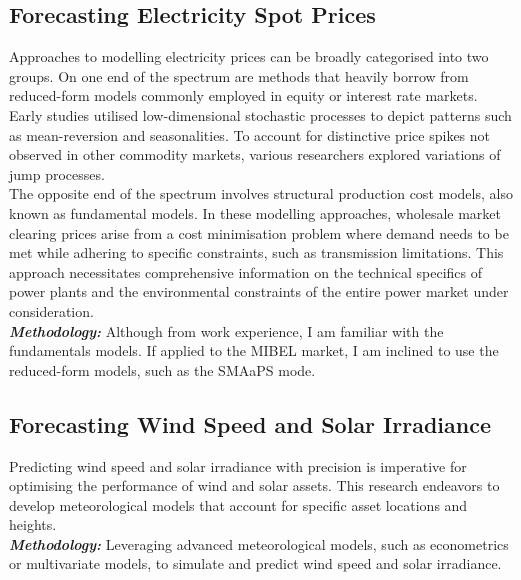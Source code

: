 \subsection{Forecasting Electricity Spot Prices}
    \label{subsec:rs_forecasting-electricity-spot-prices}

    Approaches to modelling electricity prices can be broadly categorised into two groups.
    On one end of the spectrum are methods that heavily borrow from reduced-form models
    commonly employed in equity or interest rate markets.
    Early studies utilised low-dimensional stochastic processes to depict patterns
    such as mean-reversion and seasonalities.
    To account for distinctive price spikes not observed in other commodity markets,
    various researchers explored variations of jump processes.\\

    The opposite end of the spectrum involves structural production cost models, also known as fundamental models.
    In these modelling approaches, wholesale market clearing prices arise from a cost minimisation problem
    where demand needs to be met while adhering to specific constraints, such as transmission limitations.
    This approach necessitates comprehensive information on the technical specifics of power plants and
    the environmental constraints of the entire power market under consideration.\\

    \textbf{\textit{Methodology: }} Although from work experience, I am familiar with the fundamentals models.
    If applied to the MIBEL market, I am inclined to use the reduced-form models, such as the SMAaPS mode\cite{burger_spot_2004}.

\subsection{Forecasting Wind Speed and Solar Irradiance}
    \label{subsec:rs_forecasting-wind-speed-and-solar-irradiance}

    Predicting wind speed and solar irradiance with precision is imperative for optimising the performance of
    wind and solar assets.
    This research endeavors to develop meteorological models that account for specific asset locations and heights.\\

    \textbf{\textit{Methodology: }} Leveraging advanced meteorological models,
    such as econometrics or multivariate models\cite{benth_multivariate_2019},
    to simulate and predict wind speed and solar irradiance.


